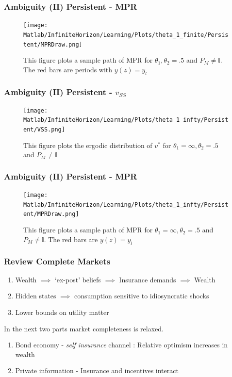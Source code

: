 \documentclass{beamer}
\theoremstyle{definition}
\begin{document}
%
\begin{frame}
\frametitle{Ambiguity (II) Persistent - MPR}
\begin{figure}[htbp]
\centering
	  \texttt{[image: Matlab/InfiniteHorizon/Learning/Plots/theta\_1\_finite/Persistent/MPRDraw.png]}
%
	\caption{\small {This figure plots a sample path of MPR for $\theta_1,\theta_2 =.5$ and $P_M \neq \mathbb{I}$}. The red bars are periods with $y(z)=y_l$}
	
	\label{fig:MPR_theta_1_finite_persistent}
	\end{figure}
\end{frame}

\begin{frame}
\frametitle{Ambiguity (II) Persistent - $v_{SS}$}
\begin{figure}[htbp]
\centering
	  \texttt{[image: Matlab/InfiniteHorizon/Learning/Plots/theta\_1\_infty/Persistent/VSS.png]}
%
	\caption{\small {This figure plots the ergodic distribution of $v^*$ for $\theta_1=\infty,\theta_2 =.5$ and $P_M \neq \mathbb{I}$}}
	
	\label{fig:VSS_theta_1_infty_persistent}
\end{figure}
\end{frame}
%
%
\begin{frame}
\frametitle{Ambiguity (II) Persistent - MPR}
\begin{figure}[htbp]
\centering
	  \texttt{[image: Matlab/InfiniteHorizon/Learning/Plots/theta\_1\_infty/Persistent/MPRDraw.png]}

	\caption{\small {This figure plots a sample path of MPR for $\theta_1=\infty,\theta_2 =.5$ and $P_M \neq \mathbb{I}$. The red bars are $y(z)=y_l$}}
%	
	\label{fig:MPR_theta_1_infty_persistent}
	\end{figure}
\end{frame}
\begin{frame}
\frametitle{Review Complete Markets}
\begin{enumerate}
	\item Wealth $\implies$ `ex-post' beliefs $\implies$ Insurance demands $\implies$ Wealth 
	\item Hidden states $\implies$ consumption sensitive to idiosyncratic shocks
	\item Lower bounds on utility matter 
\end{enumerate}
In the next two parts market completeness is relaxed. 
\begin{enumerate}
	\item Bond economy - \emph{self insurance} channel : Relative optimism increases in wealth
	\item Private information - Insurance and incentives interact
\end{enumerate}
\end{frame}
\end{document}
